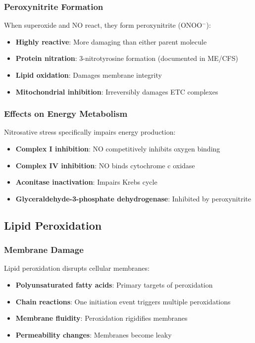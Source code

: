 \subsubsection{Peroxynitrite Formation}

When superoxide and NO react, they form peroxynitrite (ONOO$^-$):

\begin{itemize}
    \item \textbf{Highly reactive}: More damaging than either parent molecule
    \item \textbf{Protein nitration}: 3-nitrotyrosine formation (documented in ME/CFS)
    \item \textbf{Lipid oxidation}: Damages membrane integrity
    \item \textbf{Mitochondrial inhibition}: Irreversibly damages ETC complexes
\end{itemize}

\subsubsection{Effects on Energy Metabolism}

Nitrosative stress specifically impairs energy production:

\begin{itemize}
    \item \textbf{Complex I inhibition}: NO competitively inhibits oxygen binding
    \item \textbf{Complex IV inhibition}: NO binds cytochrome c oxidase
    \item \textbf{Aconitase inactivation}: Impairs Krebs cycle
    \item \textbf{Glyceraldehyde-3-phosphate dehydrogenase}: Inhibited by peroxynitrite
\end{itemize}

\subsection{Lipid Peroxidation}
\label{sec:lipid-peroxidation}

\subsubsection{Membrane Damage}

Lipid peroxidation disrupts cellular membranes:

\begin{itemize}
    \item \textbf{Polyunsaturated fatty acids}: Primary targets of peroxidation
    \item \textbf{Chain reactions}: One initiation event triggers multiple peroxidations
    \item \textbf{Membrane fluidity}: Peroxidation rigidifies membranes
    \item \textbf{Permeability changes}: Membranes become leaky
\end{itemize}

